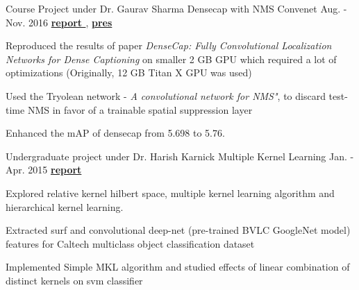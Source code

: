 \begin{cventries}
	\cventry
	{Course Project under Dr. Gaurav Sharma} %
	{Densecap with NMS Convenet} %
	{Aug. - Nov. 2016} %
	{
		\textbf{\href{https://www.dropbox.com/s/5jidhqmthy9ks06/cs698-final-report-extended.pdf?dl=0}{report \ExternalLink}},
		\textbf{\href{https://www.dropbox.com/s/byn2z4o4yiwf00b/CS698\%20Final\%20PPT.pdf?dl=0}{pres \ExternalLink}}
	} %
	{
		\begin{cvitems} %
			\item {Reproduced the results of paper \textit{DenseCap: Fully Convolutional Localization Networks for Dense Captioning}  on smaller 2 GB GPU which required a lot of optimizations (Originally, 12 GB Titan X GPU was used)}
			\item Used the Tryolean network - \textit{ A convolutional network for NMS"}, to discard test-time NMS in favor of a trainable spatial suppression layer
			\item {Enhanced the mAP of densecap from 5.698 to 5.76.}
		\end{cvitems}
	}
	
	\cventry
	{Undergraduate project under Dr. Harish Karnick} %
	{Multiple Kernel Learning} %
	{Jan. - Apr. 2015} %
	{\href{https://www.dropbox.com/s/dg987vl0zdfh6kj/cs396-graduate-project.pdf?dl=0}{\textbf{report \ExternalLink}}} %
	{
		\begin{cvitems} %
			 \item {Explored relative kernel hilbert space, multiple kernel learning algorithm and hierarchical kernel learning.}
			 \item {Extracted surf and convolutional deep-net (pre-trained BVLC GoogleNet model) features for Caltech multiclass object classification dataset}
			 \item {Implemented Simple MKL algorithm and studied effects of linear combination of distinct kernels on svm classifier}
		\end{cvitems}
	}
	


\end{cventries}
